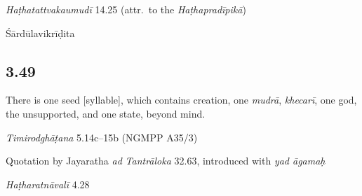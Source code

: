 \begin{ekdosis}
\begin{testimonia}[hp03_048]
\emph{Haṭhatattvakaumudī} 14.25 (attr.~to the \emph{Haṭhapradīpikā})
\begin{versinnote}
\end{versinnote}
\end{testimonia}


\begin{metre}[hp03_048]
Śārdūlavikrīḍita 
\end{metre}

\subsection*{3.49}
\begin{translation}[hp03_049]
There is one seed [syllable], which contains creation, one \emph{mudrā}, \emph{khecarī}, one god, the unsupported, and one state, beyond mind.
\end{translation}

\begin{sources}[hp03_049]
\emph{Timirodghāṭana} 5.14c–15b (NGMPP A35/3)
\begin{versinnote}
\end{versinnote}

Quotation by Jayaratha \emph{ad} \emph{Tantrāloka} 32.63, introduced with \emph{yad āgamaḥ}
\begin{versinnote}
\end{versinnote}
\end{sources}

\begin{testimonia}[hp03_049]
\emph{Haṭharatnāvalī} 4.28
\begin{versinnote}
\end{versinnote}


\end{testimonia}
\end{ekdosis}
